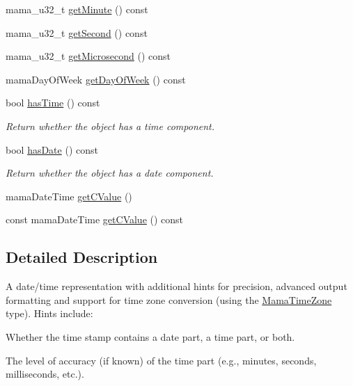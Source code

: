 \begin{DoxyCompactItemize}
\item 
mama\_\-u32\_\-t \hyperlink{classWombat_1_1MamaDateTime_af910e4dc528a9d49b6515cf6d58d8362}{getMinute} () const 
\item 
mama\_\-u32\_\-t \hyperlink{classWombat_1_1MamaDateTime_ab65d2b7e006e89927bbb923237e354b8}{getSecond} () const 
\item 
mama\_\-u32\_\-t \hyperlink{classWombat_1_1MamaDateTime_a35248ae77e516d88d86b32de9f6697df}{getMicrosecond} () const 
\item 
mamaDayOfWeek \hyperlink{classWombat_1_1MamaDateTime_aefb6a536ee7225e86d5f0802cc5514ce}{getDayOfWeek} () const 
\item 
bool \hyperlink{classWombat_1_1MamaDateTime_adda7ed3aad76e13cc020e89c24f54b0d}{hasTime} () const 
\begin{DoxyCompactList}\small\item\em Return whether the object has a time component. \item\end{DoxyCompactList}\item 
bool \hyperlink{classWombat_1_1MamaDateTime_a670f5d49b9eae47d0a5593df4f7a622d}{hasDate} () const 
\begin{DoxyCompactList}\small\item\em Return whether the object has a date component. \item\end{DoxyCompactList}\item 
mamaDateTime \hyperlink{classWombat_1_1MamaDateTime_aa332e6644fd1bcee35d417188c50aeb3}{getCValue} ()
\item 
const mamaDateTime \hyperlink{classWombat_1_1MamaDateTime_a59cb3db21937c616d42359380914fa4a}{getCValue} () const 
\end{DoxyCompactItemize}


\subsection{Detailed Description}
A date/time representation with additional hints for precision, advanced output formatting and support for time zone conversion (using the \hyperlink{classWombat_1_1MamaTimeZone}{MamaTimeZone} type). Hints include:
\begin{DoxyItemize}
\item Whether the time stamp contains a date part, a time part, or both.
\item The level of accuracy (if known) of the time part (e.g., minutes, seconds, milliseconds, etc.).
\end{DoxyItemize}

